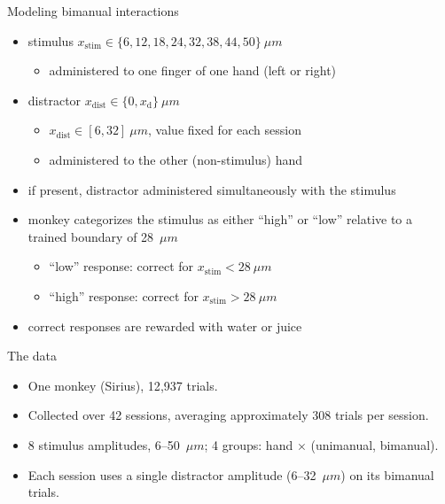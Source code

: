 \begin{frame}{Modeling bimanual interactions}
  \begin{itemize}
    \item \textcolor{muted!60}{stimulus $x_\text{stim} \in \{6, 12, 18, 24, 32, 38, 44, 50 \}~\mu m$}
    \begin{itemize}
      \item \textcolor{muted!60}{administered to one finger of one hand (left or right)}
    \end{itemize}
    \item \textcolor{plotblue}{distractor $x_\text{dist} \in \{0, x_\text{d}\}~\mu m$}
    \begin{itemize}
      \item \textcolor{plotblue}{$x_\text{dist} \in [6, 32]~\mu m$, value fixed for each session}
      \item \textcolor{plotblue}{administered to the other (non-stimulus) hand}
    \end{itemize}
    \item \textcolor{plotblue}{if present, distractor administered simultaneously with the stimulus}
    \item \textcolor{muted!60}{monkey categorizes the stimulus as either
          ``high'' or ``low'' relative to a trained boundary of 28~$\mu m$}
    \begin{itemize}
      \item \textcolor{muted!60}{``low'' response: correct for $x_\text{stim} < 28~\mu m$}
      \item \textcolor{muted!60}{``high'' response: correct for $x_\text{stim} > 28~\mu m$}
    \end{itemize}
    \item \textcolor{muted!60}{correct responses are rewarded with water or juice}
  \end{itemize}
\end{frame}

\begin{frame}{The data}
  \begin{itemize}
    \item One monkey (Sirius), 12{,}937 trials.
    \item Collected over 42 sessions, averaging approximately 308 trials per session.
    \item 8 stimulus amplitudes, 6--50~$\mu m$; 4 groups: hand $\times$
          (unimanual, bimanual).
    \item Each session uses a single distractor amplitude (6--32~$\mu m$) on its
          bimanual trials.
  \end{itemize}
  \vfill
  \centering\footnotesize
  
  \vfill
\end{frame}

